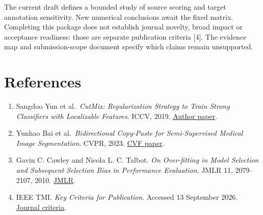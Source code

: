 \documentclass[
]{article}
\providecommand{\tightlist}{%
  \setlength{\itemsep}{0pt}\setlength{\parskip}{0pt}}
\begin{document}
The current draft defines a bounded study of source scoring and target
annotation sensitivity. New numerical conclusions await the fixed
matrix. Completing this package does not establish journal novelty,
broad impact or acceptance readiness: those are separate publication
criteria {[}4{]}. The evidence map and submission-scope document specify
which claims remain unsupported.

\section{References}\label{references}

\begin{enumerate}
\def\labelenumi{\arabic{enumi}.}
\tightlist
\item
  Sangdoo Yun et al.~\emph{CutMix: Regularization Strategy to Train
  Strong Classifiers with Localizable Features}. ICCV, 2019.
  \href{https://arxiv.org/abs/1905.04899}{Author paper}.
\item
  Yunhao Bai et al.~\emph{Bidirectional Copy-Paste for Semi-Supervised
  Medical Image Segmentation}. CVPR, 2023.
  \href{https://openaccess.thecvf.com/content/CVPR2023/papers/Bai_Bidirectional_Copy-Paste_for_Semi-Supervised_Medical_Image_Segmentation_CVPR_2023_paper.pdf}{CVF
  paper}.
\item
  Gavin C. Cawley and Nicola L. C. Talbot. \emph{On Over-fitting in
  Model Selection and Subsequent Selection Bias in Performance
  Evaluation}. JMLR 11, 2079--2107, 2010.
  \href{https://www.jmlr.org/beta/papers/v11/cawley10a.html}{JMLR}.
\item
  IEEE TMI. \emph{Key Criteria for Publication}. Accessed 13 September
  2026. \href{https://ieeetmi.org/key-criteria-for-publication/}{Journal
  criteria}.
\end{enumerate}
\end{document}
